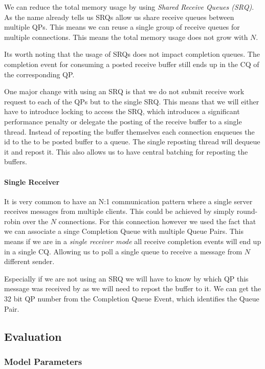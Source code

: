 We can reduce the total memory usage by using \emph{Shared Receive Queues (SRQ)}. As the name already tells us SRQs allow us
share receive queues between multiple QPs. This means we can reuse a single group of receive queues for multiple connections.
This means the total memory usage does not grow with $N$.

Its worth noting that the usage of SRQs does not impact completion queues. The completion event for consuming a posted receive
buffer still ends up in the CQ of the corresponding QP.

One major change with using an SRQ is that we do not submit receive work request to each of the QPs but to the single SRQ. This
means that we will either have to introduce locking to access the SRQ, which introduces a significant performance penalty or 
delegate the posting of the receive buffer to a single thread. Instead of reposting the buffer themselves each connection 
enqueues the id to the to be posted buffer to a queue. The single reposting thread will dequeue it and repost it. This also
allows us to have central batching for reposting the buffers.

\paragraph{Single Receiver} It is very common to have an N:1 communication pattern where a single server receives messages 
from multiple clients. This could be achieved by simply round-robin over the $N$ connections. For this connection however 
we used the fact that we can associate a singe Completion Queue with multiple Queue Pairs. This means if we are in a
\emph{single receiver mode} all receive completion events will end up in a single CQ. Allowing us to poll a single queue to
receive a message from $N$ different sender.

Especially if we are not using an SRQ we will have to know by which QP this message was received by as we will need to repost
the buffer to it. We can get the 32 bit QP number from the Completion Queue Event, which identifies the Queue Pair. 

\subsection{Evaluation}

\subsubsection{Model Parameters}

